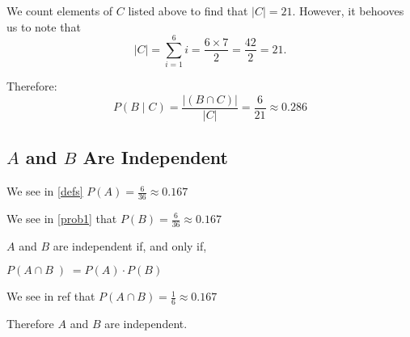 \documentclass[a4paper,11pt]{article}
\begin{document}
We count elements of $C$ listed above to find that $\left| C \right|
= 21$.  However, it behooves us to note that 
\begin{equation}
  \left| C \right| = \sum_{i=1}^{6} i = \frac{6 \times 7} {2} = 
    \frac{42}{2} = 21.
\end{equation}

Therefore:
\begin{equation}
  P\left( B \mid C \right) = 
  \frac{\left| \left( B \cap C \right) \right|} {\left| C \right|}
  = \frac{6}{21} \approx 0.286
\end{equation}

\subsection{$A$ and $B$ Are Independent}
We see in  \ref{defs} $P \left( A \right) = \frac{6}{36} \approx 0.167$

We see in \ref{prob1} that $P \left(B \right) = \frac{6}{36} \approx 0.167$

$A$ and $B$ are independent if, and only if, 

$P\left( A \cap B \left) = P\left( A \right) \cdot P\left(B \right)$

We see in ref{\BGivenA} that $P\left(A \cap B \right)=\frac{1}{6} \approx 0.167$

Therefore $A$ and $B$ are independent. \blacksquare

\printbibliography{}
\end{document}
